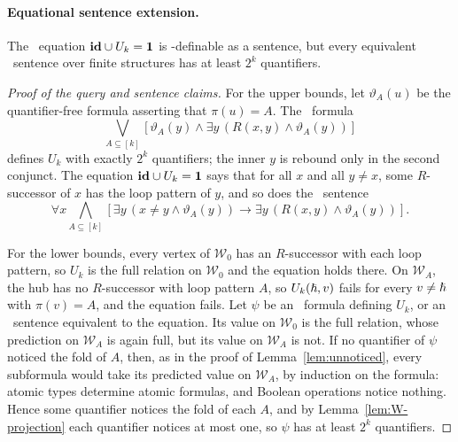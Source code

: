 \reverse*
\paragraph{Equational sentence extension.}
The \CoR\ equation $\mathbf{id}\cup U_k=\mathbf{1}$ is \FOtwo-definable as a
sentence, but every equivalent \FOtwo\ sentence over finite
structures has at least $2^k$ quantifiers.
\begin{proof}[Proof of the query and sentence claims]
For the upper bounds, let $\vartheta_A(u)$ be the quantifier-free
formula asserting that $\pi(u)=A$. The \FOtwo\ formula
\[
 \bigvee_{A\subseteq[k]}\left[\vartheta_A(y)\land
       \exists y\,(R(x,y)\land\vartheta_A(y))\right]
\]
defines $U_k$ with exactly $2^k$ quantifiers; the inner $y$ is rebound
only in the second conjunct. The equation $\mathbf{id}\cup U_k=\mathbf{1}$ says that
for all $x$ and all $y\ne x$, some $R$-successor of $x$ has the loop
pattern of $y$, and so does the \FOtwo\ sentence
\[
 \forall x\bigwedge_{A\subseteq[k]}\left[
 \exists y\,(x \neq y\land\vartheta_A(y))\rightarrow
 \exists y\,(R(x,y)\land\vartheta_A(y))\right].
\]

For the lower bounds, every vertex of $\mathcal W_0$ has an $R$-successor
with each loop pattern, so $U_k$ is the full relation on $\mathcal W_0$
and the equation holds there. On $\mathcal W_A$, the hub has no
$R$-successor with loop pattern $A$, so $U_k(\hslash,v)$ fails for every
$v\ne\hslash$ with $\pi(v)=A$, and the equation fails. Let $\psi$ be an
\FOtwo\ formula defining $U_k$, or an \FOtwo\ sentence equivalent to the
equation. Its value on $\mathcal W_0$ is the full relation, whose
prediction on $\mathcal W_A$ is again full, but its value on
$\mathcal W_A$ is not. If no quantifier of $\psi$ noticed the fold of
$A$, then, as in the proof of Lemma~\ref{lem:unnoticed}, every subformula
would take its predicted value on $\mathcal W_A$, by induction on the
formula: atomic types determine atomic formulas, and Boolean operations
notice nothing. Hence some quantifier notices the fold of each $A$, and
by Lemma~\ref{lem:W-projection} each quantifier notices at most one, so
$\psi$ has at least $2^k$ quantifiers.
\end{proof}
